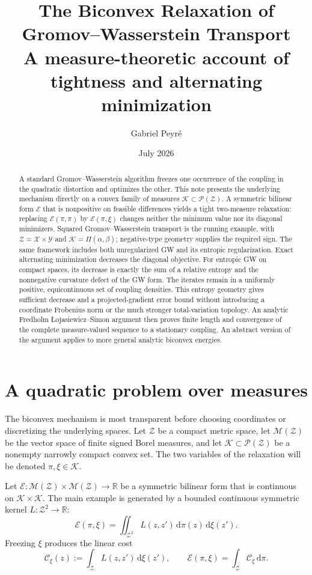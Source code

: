 \documentclass[11pt]{article}
\title{\textbf{The Biconvex Relaxation of\\
Gromov--Wasserstein Transport}\\
\large A measure-theoretic account of tightness and alternating minimization}
\author{Gabriel Peyr\'e}
\date{July 2026}
\theoremstyle{definition}
\theoremstyle{remark}
\newcommand{\R}{\mathbb R}
\newcommand{\Mcal}{\mathcal M}
\newcommand{\Pcal}{\mathcal P}
\newcommand{\Kcal}{\mathcal K}
\newcommand{\Ee}{\mathcal E}
\newcommand{\Ccal}{\mathcal C}
\newcommand{\dd}{\,\mathrm d}
\begin{document}
\maketitle

\begin{abstract}
A standard Gromov--Wasserstein algorithm freezes one occurrence of the
coupling in the quadratic distortion and optimizes the other.  This note
presents the underlying mechanism directly on a convex family of measures
\(\Kcal\subset\Pcal(\mathcal Z)\).  A symmetric bilinear form \(\Ee\) that
is nonpositive on feasible differences yields a tight two-measure relaxation:
replacing \(\Ee(\pi,\pi)\) by \(\Ee(\pi,\xi)\) changes neither the minimum
value nor its diagonal minimizers.  Squared Gromov--Wasserstein transport is
the running example, with \(\mathcal Z=\mathcal X\times\mathcal Y\) and
\(\Kcal=\Pi(\alpha,\beta)\); negative-type geometry supplies the required
sign.  The same framework includes both unregularized GW and its entropic
regularization.  Exact alternating minimization decreases the diagonal
objective.  For entropic GW on compact spaces, its decrease is exactly the
sum of a relative entropy and the nonnegative curvature defect of the GW
form.  The iterates remain in a uniformly positive, equicontinuous set of
coupling densities.  This entropy geometry gives sufficient decrease and a
projected-gradient error bound without introducing a coordinate Frobenius
norm or the much stronger total-variation topology.  An analytic Fredholm
{\L}ojasiewicz--Simon argument then proves finite length and convergence of
the complete measure-valued sequence to a stationary coupling.  An abstract
version of the argument applies to more general analytic biconvex energies.
\end{abstract}

\section{A quadratic problem over measures}
\label{sec:measure-setup}

The biconvex mechanism is most transparent before choosing coordinates or
discretizing the underlying spaces.  Let \(\mathcal Z\) be a compact metric
space, let \(\Mcal(\mathcal Z)\) be the vector space of finite signed Borel
measures, and let \(\Kcal\subset\Pcal(\mathcal Z)\) be a nonempty narrowly
compact convex set.  The two variables of the relaxation will be denoted
\(\pi,\xi\in\Kcal\).

Let
\(
  \Ee:\Mcal(\mathcal Z)\times\Mcal(\mathcal Z)\to\R
\)
be a symmetric bilinear form that is continuous on \(\Kcal\times\Kcal\).
The main example is generated by a bounded continuous symmetric kernel
\(L:\mathcal Z^2\to\R\):
\begin{equation}\label{eq:kernel-bilinear-form}
  \Ee(\pi,\xi)
  =
  \iint_{\mathcal Z^2}L(z,z')\dd\pi(z)\dd\xi(z').
\end{equation}
Freezing \(\xi\) produces the linear cost
\begin{equation}\label{eq:frozen-cost}
  \Ccal_\xi(z)
  :=\int_{\mathcal Z}L(z,z')\dd\xi(z'),
  \qquad
  \Ee(\pi,\xi)=\int_{\mathcal Z}\Ccal_\xi\dd\pi.
\end{equation}
\end{document}
